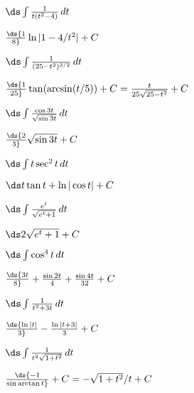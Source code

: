 \begin{enumialphparenastyle}
\begin{ex}	%
 $\ds\int {1\over t(t^2-4)}\,dt$
\begin{sol}
 $\ds {1\over8} \ln|1-4/t^2|+C$
\end{sol}
\end{ex}

\begin{ex}	%
 $\ds\int {1\over (25-t^2)^{3/2}}\,dt$
\begin{sol}
 $\ds{1\over25}\tan(\arcsin(t/5))+C={t\over25\sqrt{25-t^2}}+C$
\end{sol}
\end{ex}

\begin{ex}	%
 $\ds\int {\cos 3t\over\sqrt{\sin3t}}\,dt$
\begin{sol}
 $\ds{2\over3}\sqrt{\sin 3t}+C$
\end{sol}
\end{ex}

\begin{ex}	%
 $\ds\int t\sec^2 t\,dt$
\begin{sol}
 $\ds t\tan t+\ln|\cos t|+C$
\end{sol}
\end{ex}

\begin{ex}	%
 $\ds\int {e^t\over \sqrt{e^t+1}}\,dt$
\begin{sol}
 $\ds 2\sqrt{e^t+1}+C$
\end{sol}
\end{ex}

\begin{ex}	%
 $\ds\int \cos^4 t\,dt$
\begin{sol}
 $\ds{3t\over 8}+{\sin 2t\over4}+ {\sin 4t\over 32}+C$
\end{sol}
\end{ex}

\begin{ex}	%
 $\ds\int {1\over t^2+3t}\,dt$
\begin{sol}
 $\ds{\ln |t|\over 3} - {\ln |t+3|\over 3}+C$
\end{sol}
\end{ex}

\begin{ex}	%
 $\ds\int {1\over t^2\sqrt{1+t^2}}\,dt$
\begin{sol}
 $\ds{-1\over \sin\arctan t}+C=-\sqrt{1+t^2}/t+C$
\end{sol}
\end{ex}


\end{enumialphparenastyle}

